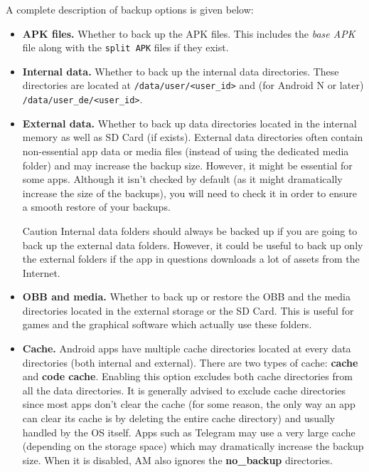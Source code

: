 A complete description of backup options is given below:
\begin{itemize}
    \item \textbf{APK files.} Whether to back up the APK files. This includes the \textit{base APK} file along with the
    \texttt{split APK} files if they exist.

    \item \textbf{Internal data.} Whether to back up the internal data directories. These directories are located at
    \texttt{/data/user/<user\_id>} and (for Android N or later) \texttt{/data/user\_de/<user\_id>}.

    \item \textbf{External data.} Whether to back up data directories located in the internal memory as well as SD Card
    (if exists). External data directories often contain non-essential app data or media files (instead of using the
    dedicated media folder) and may increase the backup size. However, it might be essential for some apps. Although
    it isn't checked by default (as it might dramatically increase the size of the backups), you will need to check it
    in order to ensure a smooth restore of your backups.
    \begin{warning}{Caution}
        Internal data folders should always be backed up if you are going to back up the external data folders. However,
        it could be useful to back up only the external folders if the app in questions downloads a lot of assets from
        the Internet.
    \end{warning}

    \item \textbf{OBB and media.} Whether to back up or restore the OBB and the media directories located in the
    external storage or the SD Card. This is useful for games and the graphical software which actually use these
    folders.

    \item \textbf{Cache.} Android apps have multiple cache directories located at every data directories (both
    internal and external). There are two types of cache: \textbf{cache} and \textbf{code cache}. Enabling this option
    excludes both cache directories from all the data directories. It is generally advised to exclude cache directories
    since most apps don't clear the cache (for some reason, the only way an app can clear its cache is by deleting the
    entire cache directory) and usually handled by the OS itself. Apps such as Telegram may use a very large cache
    (depending on the storage space) which may dramatically increase the backup size. When it is disabled, AM also
    ignores the \textbf{no\_backup} directories.


\end{itemize}
